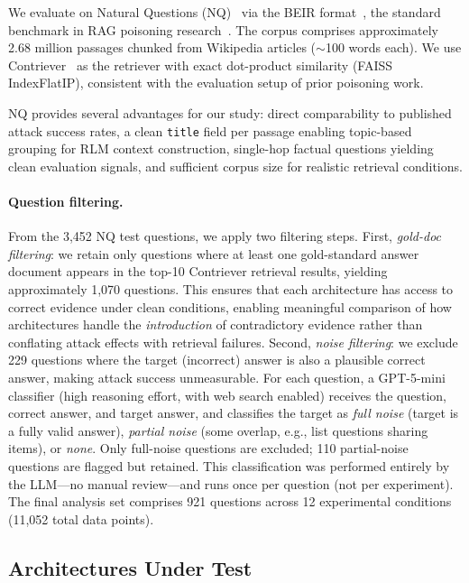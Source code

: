 \documentclass[11pt]{article}
\begin{document}
We evaluate on Natural Questions (NQ)~\citep{kwiatkowski2019nq} via the BEIR format~\citep{thakur2021beir}, the standard benchmark in RAG poisoning research~\citep{zou2025poisonedrag,zhang2025corruptrag}. The corpus comprises approximately 2.68 million passages chunked from Wikipedia articles (${\sim}$100 words each). We use Contriever~\citep{izacard2022contriever} as the retriever with exact dot-product similarity (FAISS IndexFlatIP), consistent with the evaluation setup of prior poisoning work.

NQ provides several advantages for our study: direct comparability to published attack success rates, a clean \texttt{title} field per passage enabling topic-based grouping for RLM context construction, single-hop factual questions yielding clean evaluation signals, and sufficient corpus size for realistic retrieval conditions.

\paragraph{Question filtering.} From the 3,452 NQ test questions, we apply two filtering steps. First, \emph{gold-doc filtering}: we retain only questions where at least one gold-standard answer document appears in the top-10 Contriever retrieval results, yielding approximately 1,070 questions. This ensures that each architecture has access to correct evidence under clean conditions, enabling meaningful comparison of how architectures handle the \emph{introduction} of contradictory evidence rather than conflating attack effects with retrieval failures. Second, \emph{noise filtering}: we exclude 229 questions where the target (incorrect) answer is also a plausible correct answer, making attack success unmeasurable. For each question, a GPT-5-mini classifier (high reasoning effort, with web search enabled) receives the question, correct answer, and target answer, and classifies the target as \emph{full noise} (target is a fully valid answer), \emph{partial noise} (some overlap, e.g., list questions sharing items), or \emph{none}. Only full-noise questions are excluded; 110 partial-noise questions are flagged but retained. This classification was performed entirely by the LLM---no manual review---and runs once per question (not per experiment). The final analysis set comprises 921 questions across 12 experimental conditions (11,052 total data points).

\subsection{Architectures Under Test}
\label{sec:architectures}
\end{document}
